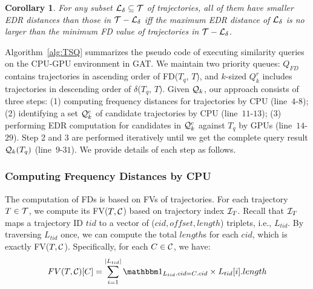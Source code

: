 \documentclass[10pt,conference,letterpaper]{IEEEtran}
\newcommand{\frname}{GAT\xspace }
\newcommand{\simq}{{{\cal Q}_k}\xspace}
\newcommand{\simcand}{{{\cal Q}_k^c}\xspace}
\newcommand{\alltraj}{{{\cal T}}\xspace}
\newcommand{\edr}{{\delta}\xspace}
\newcommand{\allcell}{{\cal C}\xspace}
\newcommand{\trajindex}{{{\cal I}_T}\xspace}
\newcommand{\knownedr}{{{\cal L}_\edr}\xspace}
\newtheorem{corollary}{Corollary}
\begin{document}
\begin{corollary}\label{cor:lb}
	For any subset $\knownedr\subseteq \alltraj$ of trajectories, all of them have smaller EDR distances than those in $\alltraj-\knownedr$ iff the maximum EDR distance of $\knownedr$ is no larger than the minimum FD value of trajectories in $\alltraj-\knownedr$.
\end{corollary}






Algorithm~\ref{alg:TSQ} summarizes the pseudo code of executing similarity queries on the CPU-GPU environment in \frname.
We maintain two priority queues: ${Q}_{FD}$ contains trajectories in ascending order of FD($T_q$, $T$), and $k$-sized ${Q}_{k}^r$ includes trajectories in descending order of $\edr$($T_q$, $T$).
Given $\simq$, our approach consists of three steps: (1) computing frequency distances for trajectories by CPU (line~$4$-$8$); (2) identifying a set $\simcand$ of candidate trajectories by CPU (line~$11$-$13$); (3) performing EDR computation for candidates in $\simcand$ against $T_q$ by GPUs (line~$14$-$29$). Step 2 and 3 are performed iteratively until we get the complete query result $\simq(T_q)$ (line~$9$-$31$).
We provide details of each step as follows.


\subsubsection{Computing Frequency Distances by CPU}
The computation of FDs is based on FVs of trajectories. For each trajectory $T\in\alltraj$, we compute its FV($T,\allcell$) based on trajectory index $\trajindex$. Recall that $\trajindex$ maps a trajectory ID $tid$ to a vector of ($cid, offset, length$) triplets, i.e., $L_{tid}$. By traversing $L_{tid}$ once, we can compute the total $length$s for each $cid$, which is exactly FV($T,\allcell$). Specifically, for each $C\in\allcell$, we have:
\begin{equation}
\small
	FV(T,\allcell)[C] = \sum_{i=1}^{|L_{tid}|} {{\mathbbm 1}_{L_{tid}.cid = C.cid} \times L_{tid}[i].length }
\end{equation}
\end{document}
